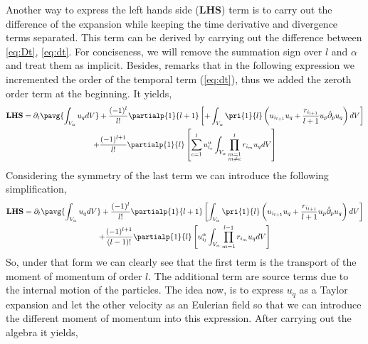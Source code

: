 {Another way to express the left hands side ($\textbf{LHS}$) term is to carry out the difference of the expansion while keeping the time derivative and divergence terms separated.  
This term can be derived by carrying out the difference between \ref{eq:Dt}, \ref{eq:dt}.
For conciseness, we will remove the summation sign over $l$ and $\alpha$ and treat them as implicit.   
Besides, remarks that in the following expression we incremented the order of the temporal term (\ref{eq:dt}), thus we added the zeroth order term at the beginning. 
It yields,
\begin{multline*}
    \textbf{LHS}
    = \partial_t \pavg{\int_{V_\alpha} u_q dV}
    + \frac{(-1)^l}{l!} \partialp{1}{l+1}
    \left[
        + \int_{V_\alpha} \pri{1}{l}
        \left(
            u_{i_{l+1}}u_q 
            +\frac{r_{i_{l+1}}}{l+1}  
            u_p \hat{\partial}_p u_q 
        \right) dV
    \right]\\
    + \frac{(-1)^{l+1}}{l!} \partialp{1}{l}
    \left[
        \sum_{e=1}^{l}
        u_{i_e}^\alpha \int_{V_\alpha}  
        \prod_{\substack{m=1 \\ m \neq e}}^{l} r_{i_m} u_q dV
    \right]
\end{multline*}
Considering the symmetry of the last term we can introduce the following simplification,
\begin{multline*}
    \textbf{LHS}
    = \partial_t \pavg{\int_{V_\alpha} u_q dV}
    + \frac{(-1)^l}{l!} \partialp{1}{l+1}
    \left[
        \int_{V_\alpha} \pri{1}{l}
        \left(
            u_{i_{l+1}}u_q 
            +\frac{r_{i_{l+1}}}{l+1}  
            u_p \hat{\partial}_p u_q 
        \right) dV
    \right]\\
    + \frac{(-1)^{l+1}}{(l-1)!} \partialp{1}{l}
    \left[
        u_{i_l}^\alpha \int_{V_\alpha}  
        \prod_{m=1}^{l-1} r_{i_m} u_q dV
    \right]
\end{multline*}
So, under that form we can clearly see that the first term is the transport of the moment of momentum of order $l$.
The additional term are source terms due to the internal motion of the particles.
The idea now, is to express $u_q$ as a Taylor expansion and let the other velocity as an Eulerian field so that we can introduce the different moment of momentum into this expression.
After carrying out the algebra it yields,
}
